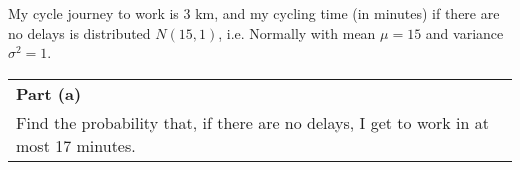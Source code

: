 \documentclass[a4paper,12pt]{article}
\begin{document}
\large
\noindent My cycle journey to work is 3 km, and my cycling time (in minutes) if there are no delays is distributed $N(15, 1)$, i.e. Normally with mean $\mu = 15$ and variance $\sigma^2 = 1$.
\smallskip

\begin{table}[ht!]
 \centering
 \begin{tabular}{|p{15cm}|}
 \hline\large
\noindent \textbf{Part (a)}\\ \large  Find the probability that, if there are no delays, I get to work in at most 17 minutes.

\\ \hline
  \end{tabular}
\end{table}



\large 
\end{document}
